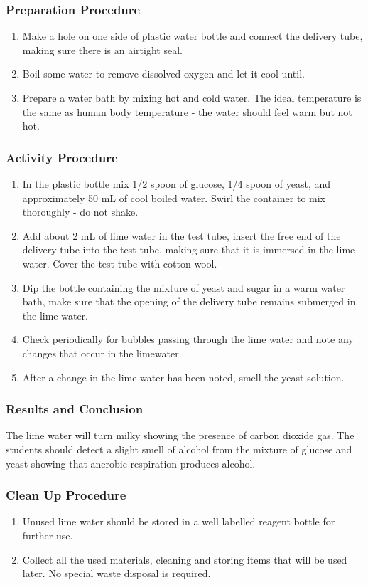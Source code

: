 \subsubsection*{Preparation Procedure}
\begin{enumerate}
\item{Make a hole on one side of plastic water bottle and connect the delivery tube, making sure there is an airtight seal.}
\item{Boil some water to remove dissolved oxygen and let it cool until.}
\item{Prepare a water bath by mixing hot and cold water. The ideal temperature is the same as human body temperature - the water should feel warm but not hot.}
\end{enumerate}

\subsubsection*{Activity Procedure}
\begin{enumerate}
\item{In the plastic bottle mix 1/2 spoon of glucose, 1/4 spoon of yeast, and approximately 50 mL of cool boiled water. Swirl the container to mix thoroughly - do not shake.}
\item{Add about 2 mL of lime water in the test tube, insert the free end of the delivery tube into the test tube, making sure that it is immersed in the lime water. Cover the test tube with cotton wool.}
\item{Dip the bottle containing the mixture of yeast and sugar in a warm water bath, make sure that the opening of the delivery tube remains submerged in the lime water.}
\item{Check periodically for bubbles passing through the lime water and note any changes that occur in the limewater.}
\item{After a change in the lime water has been noted, smell the yeast solution.}
\end{enumerate}

\subsubsection*{Results and Conclusion}
The lime water will turn milky showing the presence of carbon dioxide gas.
The students should detect a slight smell of alcohol from the mixture of glucose and yeast showing that anerobic respiration produces alcohol.

\subsubsection*{Clean Up Procedure}
\begin{enumerate}
\item{Unused lime water should be stored in a well labelled reagent bottle for further use.}
\item{Collect all the used materials, cleaning and storing items that will be used later. No special waste disposal is required.}
\end{enumerate}

